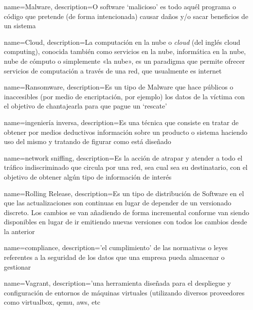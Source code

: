 {
    name=Malware,
    description={O software  `malicioso' es todo aquél programa o código que pretende (de forma intencionada) causar daños y/o sacar beneficios de un sistema}
}

{
    name=Cloud,
    description={La computación en la nube o \textit{cloud} (del inglés cloud computing), conocida también como servicios en la nube, informática en la nube, nube de cómputo o simplemente «la nube», es un paradigma que permite ofrecer servicios de computación a través de una red, que usualmente es internet}
}

{
    name=Ransomware,
    description={Es un tipo de \gls{Malware} que hace públicos o inaccesibles (por medio de encriptación, por ejemplo) los datos de la víctima con el objetivo de chantajearla para que pague un `rescate'}
}


{
    name={ingeniería inversa},
    description={Es una técnica que consiste en tratar de obtener por medios deductivos información sobre un producto o sistema haciendo uso del mismo y tratando de figurar como está diseñado}
}


{
    name=network sniffing,
    description={Es la acción de atrapar y atender a todo el tráfico indiscriminado que circula por una red, sea cual sea su destinatario, con el objetivo de obtener algún tipo de información de interés}
}

{
    name=Rolling Release,
    description={Es un tipo de distribución de Software en el que las actualizaciones son continuas en lugar de depender de un versionado discreto. Los cambios se van añadiendo de forma incremental conforme van siendo disponibles en lugar de ir emitiendo nuevas versiones con todos los cambios desde la anterior}
}

{
    name=compliance,
    description={'el cumplimiento' de las normativas o leyes referentes a la seguridad de los datos que una empresa pueda almacenar o gestionar}
}

{
    name=Vagrant,
    description={'una herramienta diseñada para el despliegue y configuración de entornos de máquinas virtuales (utilizando diversos proveedores como virtualbox, qemu, aws, etc}
}

